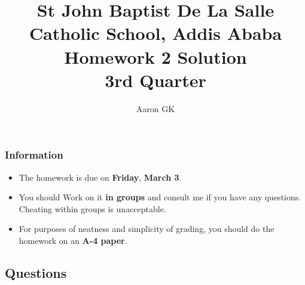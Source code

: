 \documentclass[9pt,addpoints]{exam}
\author{Aaron GK}
\begin{document}
	\title{St John Baptist De La Salle Catholic School, Addis Ababa\\
		\large Homework 2 Solution \\
		3rd Quarter}
	\maketitle
	\begin{center}
		\subsubsection*{Information}
		\begin{itemize}
			\item The homework is due on \textbf{Friday}, \textbf{March 3}.
			\item You should Work on it \textbf{in groups} and consult me if you have any questions. Cheating within groups is unacceptable.
			\item For purposes of neatness and simplicity of grading, you should do the homework on an \textbf{A-4 paper}.
		\end{itemize}
	\end{center}
	\begin{center}
		\subsection*{Questions}
	\end{center}
\end{document}
